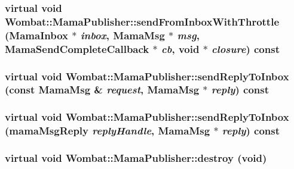 \label{classWombat_1_1MamaPublisher_aa50cc252ba9a6ac329fb5e3075be304b}
\hypertarget{classWombat_1_1MamaPublisher_aa9804ff85813df84e94bdea6215ae352}{
\subsubsection[{sendFromInboxWithThrottle}]{\setlength{\rightskip}{0pt plus 5cm}virtual void Wombat::MamaPublisher::sendFromInboxWithThrottle ({\bf MamaInbox} $\ast$ {\em inbox}, \/  {\bf MamaMsg} $\ast$ {\em msg}, \/  {\bf MamaSendCompleteCallback} $\ast$ {\em cb}, \/  void $\ast$ {\em closure}) const}}
\label{classWombat_1_1MamaPublisher_aa9804ff85813df84e94bdea6215ae352}
\hypertarget{classWombat_1_1MamaPublisher_a5a793bd5ce83062bef1d9c301394846c}{
\subsubsection[{sendReplyToInbox}]{\setlength{\rightskip}{0pt plus 5cm}virtual void Wombat::MamaPublisher::sendReplyToInbox (const {\bf MamaMsg} \& {\em request}, \/  {\bf MamaMsg} $\ast$ {\em reply}) const}}
\label{classWombat_1_1MamaPublisher_a5a793bd5ce83062bef1d9c301394846c}
\hypertarget{classWombat_1_1MamaPublisher_a4027880ca8ff1da97d8dfdd8a6ab0324}{
\subsubsection[{sendReplyToInbox}]{\setlength{\rightskip}{0pt plus 5cm}virtual void Wombat::MamaPublisher::sendReplyToInbox (mamaMsgReply {\em replyHandle}, \/  {\bf MamaMsg} $\ast$ {\em reply}) const}}
\label{classWombat_1_1MamaPublisher_a4027880ca8ff1da97d8dfdd8a6ab0324}
\hypertarget{classWombat_1_1MamaPublisher_acd7d75ae898eb5cc33851ba534c36134}{
\subsubsection[{destroy}]{\setlength{\rightskip}{0pt plus 5cm}virtual void Wombat::MamaPublisher::destroy (void)}}
